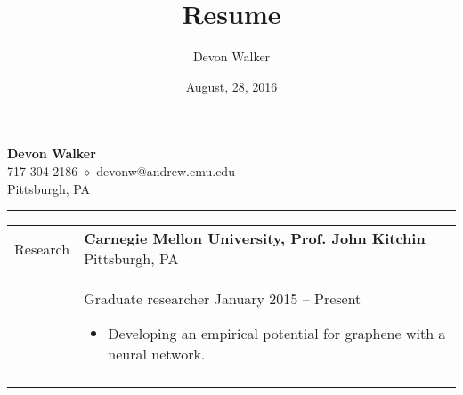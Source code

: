 \documentclass[11pt]{article}
\begin{document}
\title{Resume}
\author{Devon Walker}
\date{August, 28, 2016}

\thispagestyle{empty}
\pagestyle{empty}

\begin{center}
    {\LARGE\textbf{Devon Walker}} \\
    717-304-2186 $\diamond$ devonw@andrew.cmu.edu \\
    Pittsburgh, PA \vspace{0.5\baselineskip} \hrule
\end{center}

\vspace{0.5\baselineskip}\noindent
\renewcommand{\arraystretch}{1}%
\begin{tabular}[t]{@{}p{1.15in} @{}p{5.35in}}

{Research}
&
\textbf{Carnegie Mellon University, Prof. John Kitchin}  \hfill Pittsburgh, PA\vspace{0.015in} \\ &
Graduate researcher \hfill January 2015 -- Present\vspace{0.015in}
\begin{itemize}
    \renewcommand{\labelitemi}{$\diamond$}
    \item Developing an empirical potential for graphene with a neural network.
\end{itemize}
\\
\vspace{0.5\baselineskip}
\\


\end{tabular}
\end{document}
